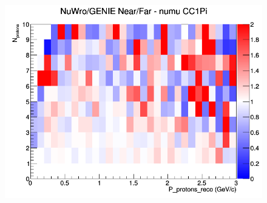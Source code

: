 \documentclass[12pt]{article}
\begin{document}
\begin{figure}[h]
\endminipage
{}
\includegraphics[width=\linewidth]{eff_N_P/LAr/protons/ratios/CC1Pi_NuWro_GENIE_numu_NF_N_P.png}
\endminipage
\newline
\end{figure}
\clearpage
\end{document}
